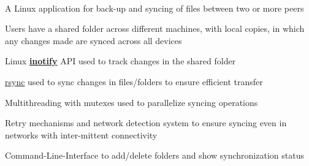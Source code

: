 \documentclass[letterpaper]{Formatting}
\begin{document}
\begin{minipage}[t]{0.66\textwidth}
\\
\vspace{1ex}
A Linux application for back-up and syncing of files between two or more peers
\vspace{\topsep} %
\footnotesize{
\begin{tightitemize}
\item Users have a shared folder across different machines, with local copies, in which any changes made are synced across all devices
\item Linux \href{http://man7.org/linux/man-pages/man7/inotify.7.html}{\textbf{inotify}} API used to track changes in the shared folder
\item \href{http://linux.about.com/library/cmd/blcmdl1_rsync.htm}{rsync} used to sync changes in files/folders to ensure efficient transfer
\item Multithreading with mutexes used to parallelize syncing operations
\item Retry mechanisms and network detection system to ensure syncing even in networks with inter-mittent connectivity
\item Command-Line-Interface to add/delete folders and show synchronization status
\end{tightitemize}
}
\sectionspace %
\vspace{2ex}
\\
\vspace{1ex}

\end{minipage}
\end{document}
